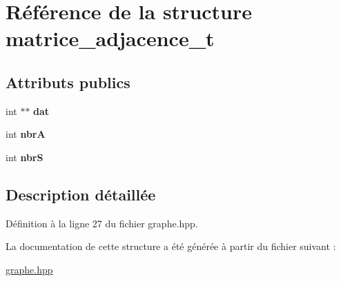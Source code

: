 \hypertarget{structmatrice__adjacence__t}{\section{Référence de la structure matrice\+\_\+adjacence\+\_\+t}
\label{structmatrice__adjacence__t}
}
\subsection*{Attributs publics}
\begin{DoxyCompactItemize}
\item 
\hypertarget{structmatrice__adjacence__t_a22789ec00178354cf7d10af8afa4bd10}{int $\ast$$\ast$ {\bfseries dat}}\label{structmatrice__adjacence__t_a22789ec00178354cf7d10af8afa4bd10}

\item 
\hypertarget{structmatrice__adjacence__t_a27d3582be114699610adb4c332ce5448}{int {\bfseries nbr\+A}}\label{structmatrice__adjacence__t_a27d3582be114699610adb4c332ce5448}

\item 
\hypertarget{structmatrice__adjacence__t_a9d7874868df1751f3f65a5a852d7e0a5}{int {\bfseries nbr\+S}}\label{structmatrice__adjacence__t_a9d7874868df1751f3f65a5a852d7e0a5}

\end{DoxyCompactItemize}


\subsection{Description détaillée}


Définition à la ligne 27 du fichier graphe.\+hpp.



La documentation de cette structure a été générée à partir du fichier suivant \+:\begin{DoxyCompactItemize}
\item 
\hyperlink{graphe_8hpp}{graphe.\+hpp}\end{DoxyCompactItemize}
